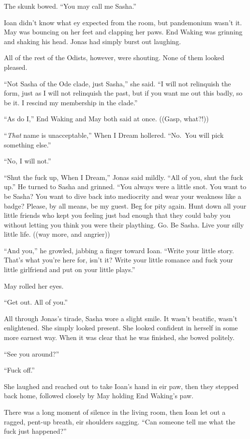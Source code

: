 The skunk bowed. ``You may call me Sasha.''

Ioan didn't know what ey expected from the room, but pandemonium wasn't it. May was bouncing on her feet and clapping her paws. End Waking was grinning and shaking his head. Jonas had simply burst out laughing.

All of the rest of the Odists, however, were shouting. None of them looked pleased.

``Not Sasha of the Ode clade, just Sasha,'' she said. ``I will not relinquish the form, just as I will not relinquish the past, but if you want me out this badly, so be it. I rescind my membership in the clade.''

``As do I,'' End Waking and May both said at once. ((Gasp, what?!))

``\emph{That} name is unacceptable,'' When I Dream hollered. ``No.~You will pick something else.''

``No, I will not.''

``Shut the fuck up, When I Dream,'' Jonas said mildly. ``All of you, shut the fuck up.'' He turned to Sasha and grinned. ``You always were a little snot. You want to be Sasha? You want to dive back into mediocrity and wear your weakness like a badge? Please, by all means, be my guest. Beg for pity again. Hunt down all your little friends who kept you feeling just bad enough that they could baby you without letting you think you were their plaything. Go. Be Sasha. Live your silly little life. ((way more, and angrier))

``And you,'' he growled, jabbing a finger toward Ioan. ``Write your little story. That's what you're here for, isn't it? Write your little romance and fuck your little girlfriend and put on your little plays.''

May rolled her eyes.

``Get out. All of you.''

All through Jonas's tirade, Sasha wore a slight smile. It wasn't beatific, wasn't enlightened. She simply looked present. She looked confident in herself in some more earnest way. When it was clear that he was finished, she bowed politely.

``See you around?''

``Fuck off.''

She laughed and reached out to take Ioan's hand in eir paw, then they stepped back home, followed closely by May holding End Waking's paw.

There was a long moment of silence in the living room, then Ioan let out a ragged, pent-up breath, eir shoulders sagging. ``Can someone tell me what the fuck just happened?''

